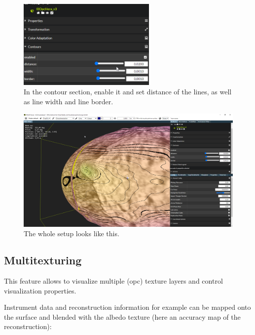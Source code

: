 \begin{figure}[h!]
	\centering
	\includegraphics[width=0.6\textwidth]{pics/contour1.png}
	\caption{In the contour section, enable it and set distance of the lines, as well as line width and line border.}
\end{figure}

\begin{figure}[h!]
	\centering
	\includegraphics[width=1.0\textwidth]{pics/contour0.png}
	\caption{The whole setup looks like this.}
\end{figure}


\clearpage

\subsection{Multitexturing}
\label{sec:multitexturing}

This feature allows to visualize multiple (opc) texture layers and control visualization properties.

Instrument data and reconstruction information for example can be mapped onto the surface and blended with the albedo texture (here an accuracy map of the reconstruction):

